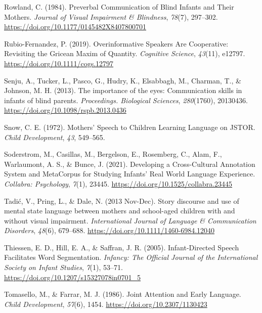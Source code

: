 \documentclass[
  man]{apa6}
\newlength{\cslhangindent}
\newlength{\cslentryspacingunit} %
\newenvironment{CSLReferences}[2] %
 {%
  \setlength{\parindent}{0pt}
  \ifodd #1
  \let\oldpar\par
  \def\par{\hangindent=\cslhangindent\oldpar}
  \fi
  \setlength{\parskip}{#2\cslentryspacingunit}
 }%
 {}
\begin{document}
\begin{CSLReferences}{1}{0}
\leavevmode{}%
Rowland, C. (1984). Preverbal {Communication} of {Blind Infants} and {Their Mothers}. \emph{Journal of Visual Impairment \& Blindness}, \emph{78}(7), 297--302. \url{https://doi.org/10.1177/0145482X8407800701}

\leavevmode{}%
Rubio-Fernandez, P. (2019). Overinformative {Speakers Are Cooperative}: {Revisiting} the {Gricean Maxim} of {Quantity}. \emph{Cognitive Science}, \emph{43}(11), e12797. \url{https://doi.org/10.1111/cogs.12797}

\leavevmode{}%
Senju, A., Tucker, L., Pasco, G., Hudry, K., Elsabbagh, M., Charman, T., \& Johnson, M. H. (2013). The importance of the eyes: Communication skills in infants of blind parents. \emph{Proceedings. Biological Sciences}, \emph{280}(1760), 20130436. \url{https://doi.org/10.1098/rspb.2013.0436}

\leavevmode{}%
Snow, C. E. (1972). Mothers' {Speech} to {Children Learning Language} on {JSTOR}. \emph{Child Development}, \emph{43}, 549--565.

\leavevmode{}%
Soderstrom, M., Casillas, M., Bergelson, E., Rosemberg, C., Alam, F., Warlaumont, A. S., \& Bunce, J. (2021). Developing a {Cross-Cultural Annotation System} and {MetaCorpus} for {Studying Infants}' {Real World Language Experience}. \emph{Collabra: Psychology}, \emph{7}(1), 23445. \url{https://doi.org/10.1525/collabra.23445}

\leavevmode{}%
Tadić, V., Pring, L., \& Dale, N. (2013 Nov-Dec). Story discourse and use of mental state language between mothers and school-aged children with and without visual impairment. \emph{International Journal of Language \& Communication Disorders}, \emph{48}(6), 679--688. \url{https://doi.org/10.1111/1460-6984.12040}

\leavevmode{}%
Thiessen, E. D., Hill, E. A., \& Saffran, J. R. (2005). Infant-{Directed Speech Facilitates Word Segmentation}. \emph{Infancy: The Official Journal of the International Society on Infant Studies}, \emph{7}(1), 53--71. \url{https://doi.org/10.1207/s15327078in0701_5}

\leavevmode{}%
Tomasello, M., \& Farrar, M. J. (1986). Joint {Attention} and {Early Language}. \emph{Child Development}, \emph{57}(6), 1454. \url{https://doi.org/10.2307/1130423}


\end{CSLReferences}
\end{document}
